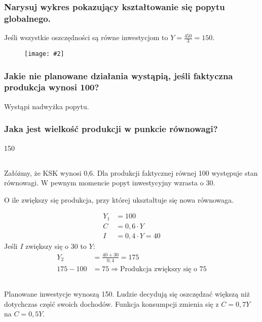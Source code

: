 \documentclass[a4paper,12pt]{article}
\newcommand{\obrazek}[2]{
	\begin{figure}[h]
		\centering
		\texttt{[image: \#2]}
	\end{figure}
}
\begin{document}
\subsubsection{Narysuj wykres pokazujący kształtowanie się popytu globalnego.}

Jeśli wszystkie oszczędności są równe inwestycjom to $Y = \frac{450}{3} = 150$.

\obrazek{0.3}{PopytGlobalny.png}

\subsubsection{Jakie nie planowane działania wystąpią, jeśli faktyczna produkcja wynosi 100?}

Wystąpi nadwyżka popytu.

\subsubsection{Jaka jest wielkość produkcji w punkcie równowagi?}

150

\subsection{}

Załóżmy, że KSK wynosi 0,6. Dla produkcji faktycznej równej 100 występuje stan równowagi. W pewnym momencie popyt inwestycyjny wzrasta o 30.

O ile zwiększy się produkcja, przy której ukształtuje się nowa równowaga.

\begin{align*}
	Y_1 & = 100              \\
	C   & = 0,6 \cdot Y      \\
	I   & = 0,4 \cdot Y = 40
\end{align*}
Jeśli $I$ zwiększy się o 30 to $Y$:
\begin{align*}
	Y_2       & = \frac{40 + 30}{0,4} = 175                         \\
	175 - 100 & = 75 \Rightarrow \text{Produkcja zwiększy się o 75}
\end{align*}

\subsection{}

Planowane inwestycje wynoszą 150. Ludzie decydują się oszczędzać większą niż dotychczas część swoich dochodów. Funkcja konsumpcji zmienia się z $C = 0,7Y$ na $C = 0,5Y$.
\end{document}
